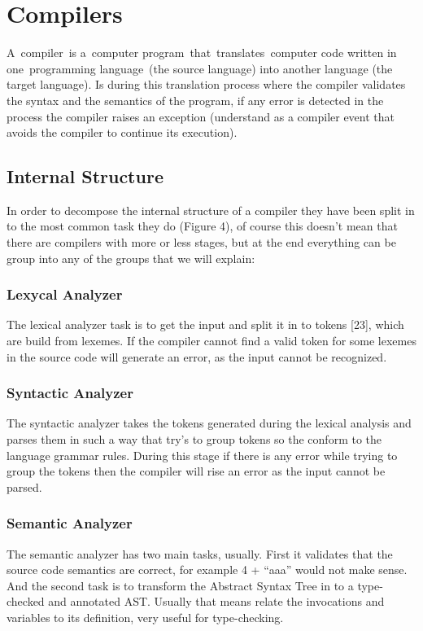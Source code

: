 \section{Compilers}
A compiler is a computer program that translates computer code written in one programming language (the source language) into another language (the target language). Is during this translation process where the compiler validates the syntax and the semantics of the program, if any error is detected in the process the compiler raises an exception (understand as a compiler event that avoids the compiler to continue its execution).

\subsection{Internal Structure}
In order to decompose the internal structure of a compiler they have been split in to the most common task they do (Figure 4), of course this doesn’t mean that there are compilers with more or less stages, but at the end everything can be group into any of the groups that we will explain:

\subsubsection{Lexycal Analyzer}
The lexical analyzer task is to get the input and split it in to tokens [23], which are build from lexemes. If the compiler cannot find a valid token for some lexemes in the source code will generate an error, as the input cannot be recognized.

\subsubsection{Syntactic Analyzer}
The syntactic analyzer takes the tokens generated during the lexical analysis and parses them in such a way that try’s to group tokens so the conform to the language grammar rules. During this stage if there is any error while trying to group the tokens then the compiler will rise an error as the input cannot be parsed.

\subsubsection{Semantic Analyzer}
The semantic analyzer has two main tasks, usually. First it validates that the source code semantics are correct, for example 4 + “aaa” would not make sense. And the second task is to transform the Abstract Syntax Tree in to a type-checked and annotated AST. Usually that means relate the invocations and variables to its definition, very useful for type-checking.

